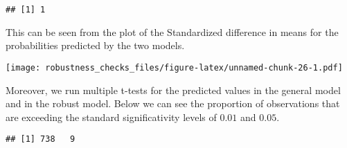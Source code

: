 \documentclass[]{article}
\newenvironment{Shaded}{\begin{snugshade}}{\end{snugshade}}
\newcommand{\DataTypeTok}[1]{\textcolor[rgb]{0.13,0.29,0.53}{#1}}
\newcommand{\DecValTok}[1]{\textcolor[rgb]{0.00,0.00,0.81}{#1}}
\newcommand{\KeywordTok}[1]{\textcolor[rgb]{0.13,0.29,0.53}{\textbf{#1}}}
\newcommand{\NormalTok}[1]{#1}
\newcommand{\OperatorTok}[1]{\textcolor[rgb]{0.81,0.36,0.00}{\textbf{#1}}}
\newcommand{\StringTok}[1]{\textcolor[rgb]{0.31,0.60,0.02}{#1}}
\begin{document}
\begin{verbatim}
## [1] 1
\end{verbatim}

This can be seen from the plot of the Standardized difference in means
for the probabilities predicted by the two models.

\texttt{[image: robustness\_checks\_files/figure-latex/unnamed-chunk-26-1.pdf]}

Moreover, we run multiple t-tests for the predicted values in the
general model and in the robust model. Below we can see the proportion
of observations that are exceeding the standard significativity levels
of \(0.01\) and \(0.05\).

\begin{Shaded}
\end{Shaded}

\begin{verbatim}
## [1] 738   9
\end{verbatim}
\end{document}
